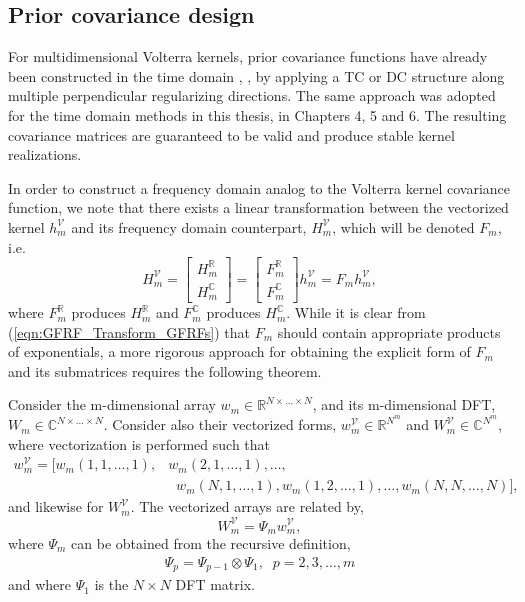 \subsection{Prior covariance design}

For multidimensional Volterra kernels, prior covariance functions have already been constructed in the time domain \cite{Birpoutsoukis2017}, \cite{Birpoutsoukis2017c}, by applying a TC or DC structure along multiple perpendicular regularizing directions. The same approach was adopted for the time domain methods in this thesis, in Chapters 4, 5 and 6. The resulting covariance matrices are guaranteed to be valid and produce stable kernel realizations.

In order to construct a frequency domain analog to the Volterra kernel covariance function, we note that there exists a linear transformation between the vectorized kernel $h_m^{\mathcal{V}}$ and its frequency domain counterpart, $H_m^{\mathcal{V}}$, which will be denoted $F_m$, i.e.
\begin{equation}
H_m^{\mathcal{V}} = \begin{bmatrix} H_m^{\mathbb{R}} \\ H_m^{\mathbb{C}} \end{bmatrix} = \begin{bmatrix} F_m^{\mathbb{R}} \\ F_m^{\mathbb{C}} \end{bmatrix} h_m^{\mathcal{V}} = F_m h_m^{\mathcal{V}},
\end{equation}
where $F_m^{\mathbb{R}}$ produces $H_m^{\mathbb{R}}$ and $F_m^{\mathbb{C}}$ produces $H_m^{\mathbb{C}}$. While it is clear from (\ref{eqn:GFRF_Transform_GFRFs}) that $F_m$ should contain appropriate products of exponentials, a more rigorous approach for obtaining the explicit form of $F_m$ and its submatrices requires the following theorem.

\begin{thm}
\label{thm:ND-DFTs}
Consider the m-dimensional array $w_m \in \mathbb{R}^{N \times \hdots \times N}$, and its m-dimensional DFT, $W_m \in \mathbb{C}^{N \times \hdots \times N}$. Consider also their vectorized forms, $w_m^{\mathcal{V}}\in \mathbb{R}^{N^{m}}$ and $W_m^{\mathcal{V}} \in \mathbb{C}^{N^{m}}$, where vectorization is performed such that 
\begin{align*}
w_m^{\mathcal{V}} = \big[ w_m(1,1,\hdots,1), &w_m(2,1,\hdots,1),\hdots, \\
& \; \; w_m(N,1,\hdots,1), w_m(1,2,\hdots,1), \hdots, w_m(N,N,\hdots,N) \big],
\end{align*}
and likewise for $W_m^{\mathcal{V}}$. The vectorized arrays are related by,
\begin{equation}
W_m^{\mathcal{V}} = \Psi_m w_m^{\mathcal{V}},
\end{equation}
where $\Psi_m$ can be obtained from the recursive definition,
\begin{align}
\Psi_p = \Psi_{p-1} \otimes \Psi_1,  \; \; p = 2, 3, \hdots, m  
\end{align}
and where $\Psi_1$ is the $N \times N$ DFT matrix.
\end{thm}

